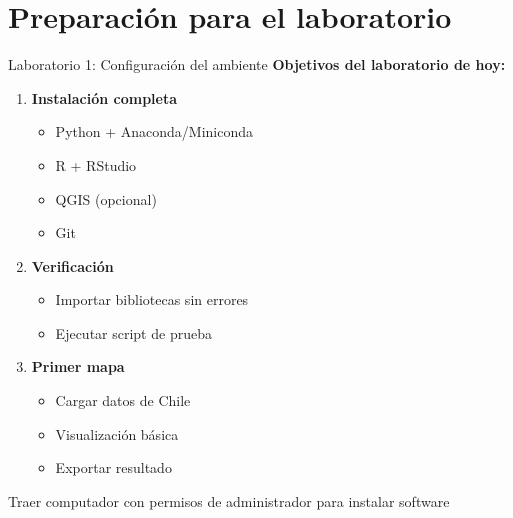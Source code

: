 \documentclass[10pt]{beamer}
\newcommand{\examplebox}[2]{
\begin{tcolorbox}[colframe=usachblue,colback=white,title=#1]
#2
\end{tcolorbox}
}
\begin{document}
\section{Preparación para el laboratorio}

\begin{frame}{Laboratorio 1: Configuración del ambiente}
    \textbf{Objetivos del laboratorio de hoy:}
    
    \begin{enumerate}
        \item \textcolor{blue}{} \textbf{Instalación completa}
        \begin{itemize}
            \item Python + Anaconda/Miniconda
            \item R + RStudio
            \item QGIS (opcional)
            \item Git
        \end{itemize}
        
        \item \textcolor{green}{} \textbf{Verificación}
        \begin{itemize}
            \item Importar bibliotecas sin errores
            \item Ejecutar script de prueba
        \end{itemize}
        
        \item \textcolor{orange}{} \textbf{Primer mapa}
        \begin{itemize}
            \item Cargar datos de Chile
            \item Visualización básica
            \item Exportar resultado
        \end{itemize}
    \end{enumerate}
    
    \vspace{0.3cm}
    \examplebox{Importante:}{
        Traer computador con permisos de administrador para instalar software
    }
\end{frame}
\end{document}
